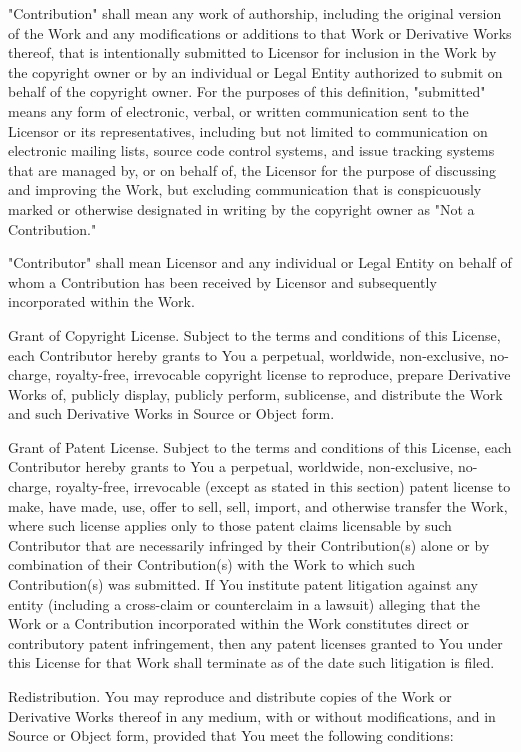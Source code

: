 \begin{DoxyEnumerate}
"{}\+Contribution"{} shall mean any work of authorship, including the original version of the Work and any modifications or additions to that Work or Derivative Works thereof, that is intentionally submitted to Licensor for inclusion in the Work by the copyright owner or by an individual or Legal Entity authorized to submit on behalf of the copyright owner. For the purposes of this definition, "{}submitted"{} means any form of electronic, verbal, or written communication sent to the Licensor or its representatives, including but not limited to communication on electronic mailing lists, source code control systems, and issue tracking systems that are managed by, or on behalf of, the Licensor for the purpose of discussing and improving the Work, but excluding communication that is conspicuously marked or otherwise designated in writing by the copyright owner as "{}\+Not a Contribution."{}

"{}\+Contributor"{} shall mean Licensor and any individual or Legal Entity on behalf of whom a Contribution has been received by Licensor and subsequently incorporated within the Work.
\item Grant of Copyright License. Subject to the terms and conditions of this License, each Contributor hereby grants to You a perpetual, worldwide, non-\/exclusive, no-\/charge, royalty-\/free, irrevocable copyright license to reproduce, prepare Derivative Works of, publicly display, publicly perform, sublicense, and distribute the Work and such Derivative Works in Source or Object form.
\item Grant of Patent License. Subject to the terms and conditions of this License, each Contributor hereby grants to You a perpetual, worldwide, non-\/exclusive, no-\/charge, royalty-\/free, irrevocable (except as stated in this section) patent license to make, have made, use, offer to sell, sell, import, and otherwise transfer the Work, where such license applies only to those patent claims licensable by such Contributor that are necessarily infringed by their Contribution(s) alone or by combination of their Contribution(s) with the Work to which such Contribution(s) was submitted. If You institute patent litigation against any entity (including a cross-\/claim or counterclaim in a lawsuit) alleging that the Work or a Contribution incorporated within the Work constitutes direct or contributory patent infringement, then any patent licenses granted to You under this License for that Work shall terminate as of the date such litigation is filed.
\item Redistribution. You may reproduce and distribute copies of the Work or Derivative Works thereof in any medium, with or without modifications, and in Source or Object form, provided that You meet the following conditions\+:


\end{DoxyEnumerate}
